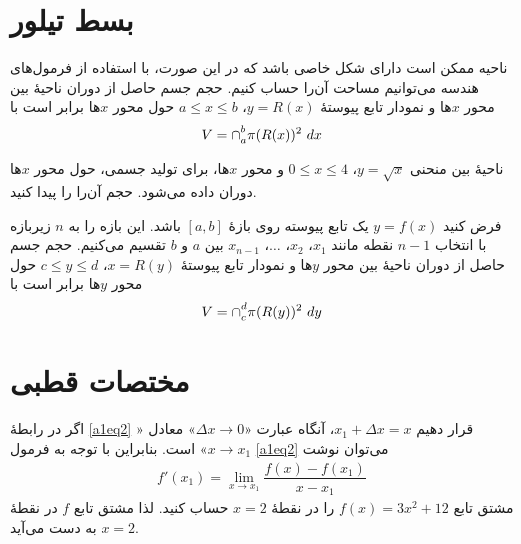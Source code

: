 \section{بسط تیلور}
ناحیه ممکن است  دارای شکل خاصی باشد که در این صورت، با استفاده از فرمول‌های  هندسه می‌توانیم مساحت آن‌را حساب کنیم.
حجم جسم حاصل از دوران ناحیهٔ بین محور $x$ها و  نمودار تابع پیوستهٔ $y=R(x)$،
$a\leq x\leq b$
 حول محور $x$ها برابر است با
 \begin{align}\label{a1eq1}
 V=\mathbin{\mathstrut{\cap}}_a^b \pi (R(x))^2 \ d x
 \end{align}
\begin{example}
ناحیهٔ بین منحنی $y=\sqrt{x}$، 
$0\leq x\leq 4$
و محور $x$ها، برای تولید جسمی، حول محور $x$ها دوران داده می‌شود. حجم آن‌‌را
را پیدا کنید.
\end{example}
فرض کنید $y=f(x)$ یک تابع پیوسته روی بازهٔ $[a,b]$ باشد. این بازه را به $n$ زیربازه با انتخاب $n-1$ نقطه مانند $x_1$، $x_2$، $\ldots$، $x_{n-1}$ بین $a$ و $b$ تقسیم می‌کنیم. 
حجم جسم حاصل از دوران ناحیهٔ بین محور $y$ها و  نمودار تابع پیوستهٔ $x=R(y)$،
$c\leq y\leq d$
 حول محور $y$ها برابر است با
 \begin{align}\label{a1eq2}
 V=\mathbin{\mathstrut{\cap}}_c^d \pi (R(y))^2 \ d y
 \end{align}
 
\section{مختصات قطبی}
اگر در رابطهٔ \eqref{a1eq2} قرار دهیم $x_1+\Delta x=x$، آنگاه عبارت
 «$\Delta x\rightarrow 0$» 
معادل «$x\rightarrow x_1$»
است. بنابراین با توجه به فرمول \eqref{a1eq2} می‌توان نوشت
\begin{align}\label{a1deri3}
f'(x_1)=\lim_{ x\rightarrow x_1}\dfrac{f(x) - f(x_1)}{x-x_1}
\end{align}
مشتق تابع $f(x)=3x^2+12$ را در نقطهٔ $x=2$ حساب کنید. لذا مشتق تابع $f$ در نقطهٔ $x=2$ به دست می‌آید.

